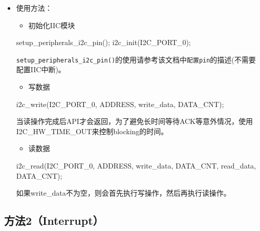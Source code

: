 \documentclass[
  12pt,
]{book}
\newenvironment{Shaded}{\begin{snugshade}}{\end{snugshade}}
\newcommand{\NormalTok}[1]{#1}
\providecommand{\tightlist}{%
  \setlength{\itemsep}{0pt}\setlength{\parskip}{0pt}}
\begin{document}
\begin{itemize}
\item
  使用方法：

  \begin{itemize}
  \tightlist
  \item
    初始化IIC模块
  \end{itemize}

\begin{Shaded}
\begin{Highlighting}[]
\NormalTok{setup_peripherals_i2c_pin();}
\NormalTok{i2c_init(I2C_PORT_0);}
\end{Highlighting}
\end{Shaded}

  \texttt{setup\_peripherals\_i2c\_pin()}的使用请参考该文档中\texttt{配置pin}的描述(不需要配置IIC中断)。

  \begin{itemize}
  \tightlist
  \item
    写数据
  \end{itemize}

\begin{Shaded}
\begin{Highlighting}[]
\NormalTok{i2c_write(I2C_PORT_0, ADDRESS, write_data, DATA_CNT);}
\end{Highlighting}
\end{Shaded}

  当读操作完成后API才会返回，为了避免长时间等待ACK等意外情况，使用I2C\_HW\_TIME\_OUT来控制blocking的时间。

  \begin{itemize}
  \tightlist
  \item
    读数据
  \end{itemize}

\begin{Shaded}
\begin{Highlighting}[]
\NormalTok{i2c_read(I2C_PORT_0, ADDRESS, write_data, DATA_CNT, read_data, DATA_CNT);}
\end{Highlighting}
\end{Shaded}

  如果write\_data不为空，则会首先执行写操作，然后再执行读操作。
\end{itemize}

\hypertarget{ux65b9ux6cd52interrupt}{%
\subsection{方法2（Interrupt）}\label{ux65b9ux6cd52interrupt}}
\end{document}

